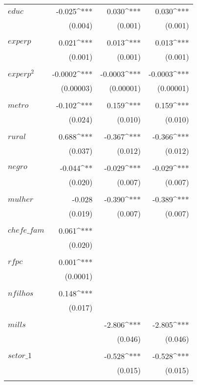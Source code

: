 \begin{apendicesenv}
\begin{footnotesize}
\begin{longtable}{@{\extracolsep{5pt}}lD{.}{.}{-3} D{.}{.}{-3} D{.}{.}{-3} }
	   $educ$       & -0.025^{***} & 0.030^{***} & 0.030^{***} \\ 
		            & (0.004) & (0.001) & (0.001) \\ 
		            & & & \\ 
	   $experp$ & 0.021^{***} & 0.013^{***} & 0.013^{***} \\ 
		& (0.001) & (0.001) & (0.001) \\ 
		& & & \\ 
		$experp^{2}$ & -0.0002^{***} & -0.0003^{***} & -0.0003^{***} \\ 
		& (0.00003) & (0.00001) & (0.00001) \\ 
		& & & \\ 
	   $metro$ & -0.102^{***} & 0.159^{***} & 0.159^{***} \\ 
		& (0.024) & (0.010) & (0.010) \\ 
		& & & \\ 
	   $rural$ & 0.688^{***} & -0.367^{***} & -0.366^{***} \\ 
		& (0.037) & (0.012) & (0.012) \\ 
		& & & \\ 
	   $negro$ & -0.044^{**} & -0.029^{***} & -0.029^{***} \\ 
		& (0.020) & (0.007) & (0.007) \\ 
		& & & \\ 
	   $mulher$ & -0.028 & -0.390^{***} & -0.389^{***} \\ 
		& (0.019) & (0.007) & (0.007) \\ 
		& & & \\ 
	   $chefe\_fam$ & 0.061^{***} &  &  \\ 
		& (0.020) &  &  \\ 
		& & & \\ 
	   $rfpc$ & 0.001^{***} &  &  \\ 
		& (0.0001) &  &  \\ 
		& & & \\ 
	   $nfilhos$ & 0.148^{***} &  &  \\ 
		& (0.017) &  &  \\ 
		& & & \\ 
	   $mills$ &  & -2.806^{***} & -2.805^{***} \\ 
		&  & (0.046) & (0.046) \\ 
		& & & \\ 
	   $setor\_1$ &  & -0.528^{***} & -0.528^{***} \\ 
		&  & (0.015) & (0.015) \\ 
		& & & \\ 

\end{longtable}
\end{footnotesize}
\end{apendicesenv}
